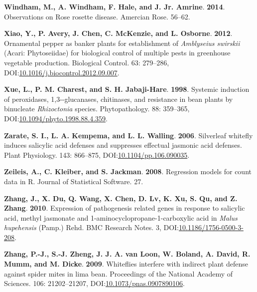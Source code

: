 \documentclass[12pt,final,CPage]{ufthesis}
\newlength{\cslhangindent}
\newenvironment{CSLReferences}[2] %
{%
	\setlength{\parindent}{0pt}
	\ifodd #1 \everypar{\setlength{\hangindent}{\cslhangindent}}\ignorespaces\fi
	\ifnum #2 > 0
	\setlength{\parskip}{#2\baselineskip}
	\fi
}%
{}
\begin{document}
{\begin{CSLReferences}{1}{0}
  \leavevmode{}%
  \textbf{Windham, M., A. Windham, F. Hale, and J. Jr. Amrine}. \textbf{2014}. Observations on {Rose rosette disease}. Amercian Rose. 56--62.

  \leavevmode{}%
  \textbf{Xiao, Y., P. Avery, J. Chen, C. McKenzie, and L. Osborne}. \textbf{2012}. Ornamental pepper as banker plants for establishment of {\emph{Amblyseius swirskii}} ({Acari}: {Phytoseiidae}) for biological control of multiple pests in greenhouse vegetable production. Biological Control. 63: 279--286, DOI:\href{https://doi.org/10.1016/j.biocontrol.2012.09.007}{10.1016/j.biocontrol.2012.09.007}.

  \leavevmode{}%
  \textbf{Xue, L., P. M. Charest, and S. H. Jabaji-Hare}. \textbf{1998}. Systemic induction of peroxidases, 1,3-\textbeta-glucanases, chitinases, and resistance in bean plants by binucleate {\emph{Rhizoctonia}} species. Phytopathology{\textregistered}. 88: 359--365, DOI:\href{https://doi.org/10.1094/phyto.1998.88.4.359}{10.1094/phyto.1998.88.4.359}.

  \leavevmode{}%
  \textbf{Zarate, S. I., L. A. Kempema, and L. L. Walling}. \textbf{2006}. Silverleaf whitefly induces salicylic acid defenses and suppresses effectual jasmonic acid defenses. Plant Physiology. 143: 866--875, DOI:\href{https://doi.org/10.1104/pp.106.090035}{10.1104/pp.106.090035}.

  \leavevmode{}%
  \textbf{Zeileis, A., C. Kleiber, and S. Jackman}. \textbf{2008}. Regression models for count data in {R}. Journal of Statistical Software. 27.

  \leavevmode{}%
  \textbf{Zhang, J., X. Du, Q. Wang, X. Chen, D. Lv, K. Xu, S. Qu, and Z. Zhang}. \textbf{2010}. Expression of pathogenesis related genes in response to salicylic acid, methyl jasmonate and 1-aminocyclopropane-1-carboxylic acid in {\emph{Malus hupehensis}} ({Pamp.}) {Rehd}. {BMC} Research Notes. 3, DOI:\href{https://doi.org/10.1186/1756-0500-3-208}{10.1186/1756-0500-3-208}.

  \leavevmode{}%
  \textbf{Zhang, P.-J., S.-J. Zheng, J. J. A. van Loon, W. Boland, A. David, R. Mumm, and M. Dicke}. \textbf{2009}. Whiteflies interfere with indirect plant defense against spider mites in lima bean. Proceedings of the National Academy of Sciences. 106: 21202--21207, DOI:\href{https://doi.org/10.1073/pnas.0907890106}{10.1073/pnas.0907890106}.


\end{CSLReferences}}
\end{document}
